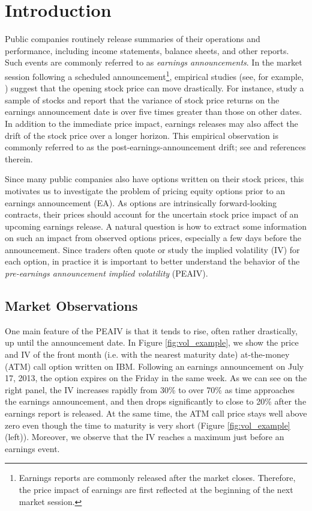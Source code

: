 \documentclass[11pt]{article}
\numberwithin{equation}{section}
\numberwithin{theorem}{section}
\begin{document}
\section{Introduction}\label{sec:introduction}
Public companies routinely  release  summaries of their operations and  performance,  including   income statements,  balance sheets, and other reports.  Such  events are  commonly referred to as  \textit{earnings announcements}.   In the   market session following a scheduled announcement\footnote{Earnings reports are commonly released after the market closes. Therefore,  the   price impact of earnings are first reflected  at the beginning of the  next market session.},  empirical studies (see, for example, \cite{Patell1984}) suggest that  the opening  stock price can  move drastically. For instance, \cite{Dubinsky2006}  study a sample of stocks and report that the variance of  stock price returns on the earnings announcement date is over  five   times greater than those on other dates.  In addition to the immediate price impact, earnings releases may  also   affect the drift of the
stock price over a longer horizon. This empirical  observation is commonly  referred to as the post-earnings-announcement drift; see \cite{Chordia2006} and references therein.


Since many public companies also have options written on their stock prices, this motivates us to investigate the problem of pricing equity options prior to an earnings announcement (EA).  As options  are intrinsically  {forward-looking}   contracts, their prices should account for  the  uncertain stock price impact of an upcoming  earnings release. A natural question is how to extract  some information on such an impact from observed options prices, especially a few days before the announcement. Since traders  often quote or study {the} implied volatility (IV) for each option, in practice it is important to  better understand the  behavior of the \textit{pre-earnings announcement implied volatility} (PEAIV).

 

\subsection{Market Observations\label{sub:market_observations}}
One main feature of the  PEAIV is that it tends to rise, often  rather  drastically, up until the announcement date.  In Figure \ref{fig:vol_example},  we show  the price and IV  of the front month ({i.e.} with the nearest maturity date) at-the-money (ATM) call option written on    IBM.   Following an earnings announcement on July 17, 2013, the option expires  on the Friday   in  the same week.  As we can see on the right panel, the IV increases rapidly from 30\% to over 70\%  as time  approaches  the earnings announcement, and then drops significantly to close to 20\% after the earnings report is released.   At the same time, the ATM call price   stays well above zero  even though the time to maturity is very short (Figure \ref{fig:vol_example} (left)).   Moreover, we  observe  that the IV reaches a maximum just before an earnings event.
\end{document}
